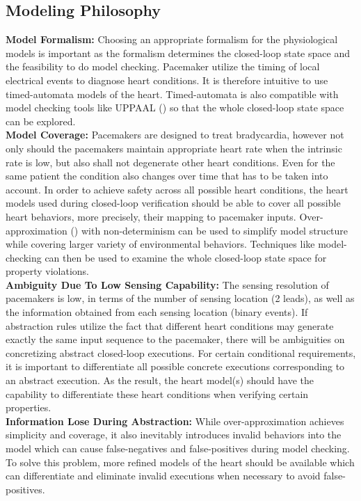 \documentclass[openany]{now} %
\begin{document}
\subsection{Modeling Philosophy}
\textbf{Model Formalism: }Choosing an appropriate formalism for the physiological models is important as the formalism determines the closed-loop state space and the feasibility to do model checking. Pacemaker utilize the timing of local electrical events to diagnose heart conditions. It is therefore intuitive to use timed-automata models of the heart. Timed-automata is also compatible with model checking tools like UPPAAL (\cite{uppaal_tut}) so that the whole closed-loop state space can be explored.\\
\textbf{Model Coverage: }Pacemakers are designed to treat bradycardia, however not only should the pacemakers maintain appropriate heart rate when the intrinsic rate is low, but also shall not degenerate other heart conditions. Even for the same patient the condition also changes over time that has to be taken into account. In order to achieve safety across all possible heart conditions, the heart models used during closed-loop verification should be able to cover all possible heart behaviors, more precisely, their mapping to pacemaker inputs. Over-approximation (\cite{CEGAR}) with non-determinism can be used to simplify model structure while covering larger variety of environmental behaviors. Techniques like model-checking can then be used to examine the whole closed-loop state space for property violations.\\ 
\textbf{Ambiguity Due To Low Sensing Capability: }The sensing resolution of pacemakers is low, in terms of the number of sensing location (2 leads), as well as the information obtained from each sensing location (binary events). If abstraction rules utilize the fact that different heart conditions may generate exactly the same input sequence to the pacemaker, there will be ambiguities on concretizing abstract closed-loop executions. For certain conditional requirements, it is important to differentiate all possible concrete executions corresponding to an abstract execution. As the result, the heart model(s) should have the capability to differentiate these heart conditions when verifying certain properties.\\
\textbf{Information Lose During Abstraction: }While over-approximation achieves simplicity and coverage, it also inevitably introduces invalid behaviors into the model which can cause false-negatives and false-positives during model checking. To solve this problem, more refined models of the heart should be available which can differentiate and eliminate invalid executions when necessary to avoid false-positives.
\end{document}
